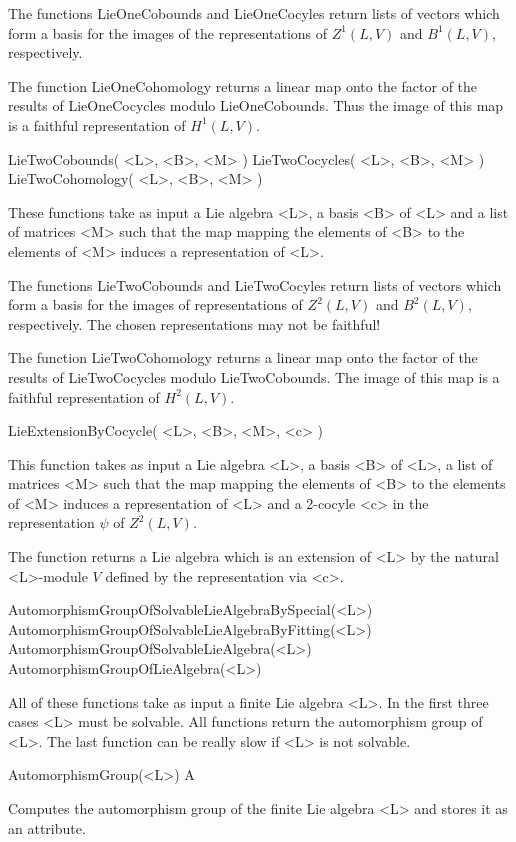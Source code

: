 The functions LieOneCobounds and LieOneCocyles return lists of vectors
which form a basis for the images of the representations of $Z^1(L, V)$ 
and $B^1(L, V)$, respectively.

The function LieOneCohomology returns a linear map onto the factor of
the results of LieOneCocycles modulo LieOneCobounds. Thus the image
of this map is a faithful representation of $H^1(L, V)$.

\> LieTwoCobounds( <L>, <B>, <M> )
\> LieTwoCocycles( <L>, <B>, <M> )
\> LieTwoCohomology( <L>, <B>, <M> )

These functions take as input a Lie algebra <L>, a basis <B> of <L> 
and a list of matrices <M> such that the map mapping the elements of
<B> to the elements of <M> induces a representation of <L>.

The functions LieTwoCobounds and LieTwoCocyles return lists of vectors
which form a basis for the images of representations of $Z^2(L, V)$ 
and $B^2(L, V)$, respectively. The chosen representations may not be
faithful!

The function LieTwoCohomology returns a linear map onto the factor of
the results of LieTwoCocycles modulo LieTwoCobounds. The image of this
map is a faithful representation of $H^2(L, V)$.

\> LieExtensionByCocycle( <L>, <B>, <M>, <c> )

This function takes as input a Lie algebra <L>, a basis <B> of <L>,
a list of matrices <M> such that the map mapping the elements of <B> 
to the elements of <M> induces a representation of <L> and a 2-cocyle
<c> in the representation $\psi$ of $Z^2(L, V)$.

The function returns a Lie algebra which is an extension of <L> by
the natural <L>-module $V$ defined by the representation via <c>.


\> AutomorphismGroupOfSolvableLieAlgebraBySpecial(<L>)
\> AutomorphismGroupOfSolvableLieAlgebraByFitting(<L>)
\> AutomorphismGroupOfSolvableLieAlgebra(<L>)
\> AutomorphismGroupOfLieAlgebra(<L>)

All of these functions take as input a finite Lie algebra <L>. In the first
three cases <L> must be solvable. All functions return the automorphism
group of <L>. The last function can be really slow if <L> is not solvable.

\> AutomorphismGroup(<L>) A

Computes the automorphism group of the finite Lie algebra <L> and stores 
it as an attribute.


